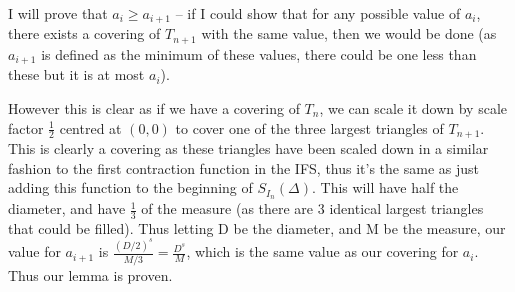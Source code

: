 I will prove that \(a_i \geq a_{i+1}\) -- if I could show that for any possible value of \(a_i\), there exists a covering of \(T_{n+1}\) with the same value, then we would be done (as \(a_{i+1}\) is defined as the minimum of these values, there could be one less than these but it is at most \(a_{i}\)).

However this is clear as if we have a covering of \(T_n\), we can scale it down by scale factor \(\frac{1}{2}\) centred at \((0,0)\) to cover one of the three largest triangles of \(T_{n+1}\). This is clearly a covering as these triangles have been scaled down in a similar fashion to the first contraction function in the IFS, thus it's the same as just adding this function to the beginning of \(S_{I_n}(\Delta)\). This will have half the diameter, and have \(\frac{1}{3}\) of the measure (as there are 3 identical largest triangles that could be filled). Thus letting D be the diameter, and M be the measure, our value for \(a_{i+1}\) is \(\frac{(D/2)^s}{M/3} = \frac{D^s}{M}\), which is the same value as our covering for \(a_i\). Thus our lemma is proven.
